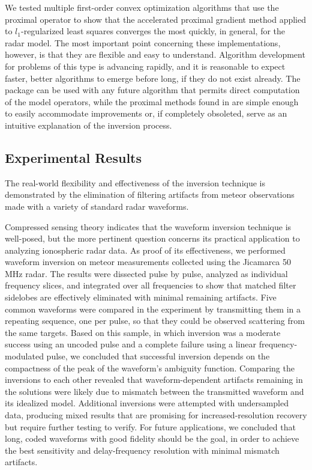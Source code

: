 We tested multiple first-order convex optimization algorithms that use the proximal operator to show that the accelerated proximal gradient method applied to $l_1$-regularized least squares converges the most quickly, in general, for the radar model. The most important point concerning these implementations, however, is that they are flexible and easy to understand. Algorithm development for problems of this type is advancing rapidly, and it is reasonable to expect faster, better algorithms to emerge before long, if they do not exist already. The  package can be used with any future algorithm that permits direct computation of the model operators, while the proximal methods found in  are simple enough to easily accommodate improvements or, if completely obsoleted, serve as an intuitive explanation of the inversion process.

\subsection{Experimental Results}
\begin{italicquote}
 The real-world flexibility and effectiveness of the inversion technique is demonstrated by the elimination of filtering artifacts from meteor observations made with a variety of standard radar waveforms.
\end{italicquote}

Compressed sensing theory indicates that the waveform inversion technique is well-posed, but the more pertinent question concerns its practical application to analyzing ionospheric radar data. As proof of its effectiveness, we performed waveform inversion on meteor measurements collected using the Jicamarca 50 MHz radar. The results were dissected pulse by pulse, analyzed as individual frequency slices, and integrated over all frequencies to show that matched filter sidelobes are effectively eliminated with minimal remaining artifacts. Five common waveforms were compared in the experiment by transmitting them in a repeating sequence, one per pulse, so that they could be observed scattering from the same targets. Based on this sample, in which inversion was a moderate success using an uncoded pulse and a complete failure using a linear frequency-modulated pulse, we concluded that successful inversion depends on the compactness of the peak of the waveform's ambiguity function. Comparing the inversions to each other revealed that waveform-dependent artifacts remaining in the solutions were likely due to mismatch between the transmitted waveform and its idealized model. Additional inversions were attempted with undersampled data, producing mixed results that are promising for increased-resolution recovery but require further testing to verify. For future applications, we concluded that long, coded waveforms with good fidelity should be the goal, in order to achieve the best sensitivity and delay-frequency resolution with minimal mismatch artifacts.

